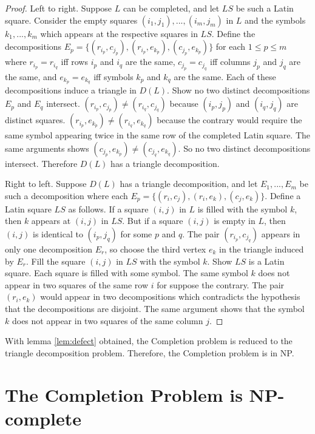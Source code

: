 \documentclass[12pt]{article}
\theoremstyle{definition}
\theoremstyle{remark}
\begin{document}
\begin{proof}
	Left to right. Suppose $L$ can be completed, and let $LS$ be such a Latin square. Consider the empty squares $(i_1, j_1), ..., (i_m, j_m)$ in $L$ and the symbols $k_1, ..., k_m$ which appears at the respective squares in $LS$. Define the decompositions $E_p = \{ (r_{i_p}, c_{j_p}), (r_{i_p}, e_{k_p}), (c_{j_p}, e_{k_p}) \}$ for each $1 \leq p \leq m$ where $r_{i_p}=r_{i_q}$ iff rows $i_p$ and $i_q$ are the same, $c_{j_p}=c_{j_q}$ iff columns $j_p$ and $j_q$ are the same, and $e_{k_p}=e_{k_q}$ iff symbols $k_p$ and $k_q$ are the same. Each of these decompositions induce a triangle in $D(L)$. Show no two distinct decompositions $E_p$ and $E_q$ intersect. $(r_{i_p}, c_{j_p}) \neq (r_{i_q}, c_{j_q})$ because $(i_p, j_p)$ and $(i_q, j_q)$ are distinct squares. $(r_{i_p}, e_{k_p}) \neq (r_{i_q}, e_{k_q})$ because the contrary would require the same symbol appearing twice in the same row of the completed Latin square. The same arguments shows $(c_{j_p}, e_{k_p}) \neq (c_{j_q}, e_{k_q})$. So no two distinct decompositions intersect. Therefore $D(L)$ has a triangle decomposition. 
	
	Right to left. Suppose $D(L)$ has a triangle decomposition, and let $E_1, ..., E_m$ be such a decomposition where each $E_p=\{ (r_{i}, c_{j}), (r_{i}, e_{k}), (c_{j}, e_{k}) \}$. Define a Latin square $LS$ as follows. If a square $(i, j)$ in $L$ is filled with the symbol $k$, then $k$ appears at $(i, j)$ in $LS$. But if a square $(i, j)$ is empty in $L$, then $(i, j)$ is identical to $(i_p, j_q)$ for some $p$ and $q$. The pair $(r_{i_p}, c_{j_q})$ appears in only one decomposition $E_r$, so choose the third vertex $e_k$ in the triangle induced by $E_r$. Fill the square $(i,j)$ in $LS$ with the symbol $k$. Show $LS$ is a Latin square. Each square is filled with some symbol. The same symbol $k$ does not appear in two squares of the same row $i$ for suppose the contrary. The pair $(r_i, e_k)$ would appear in two decompositions which contradicts the hypothesis that the decompositions are disjoint. The same argument shows that the symbol $k$ does not appear in two squares of the same column $j$.
\end{proof}

With lemma \ref{lem:defect} obtained, the Completion problem is reduced to the triangle decomposition problem. Therefore, the Completion problem is in NP.

\section{The Completion Problem is NP-complete}
\end{document}
